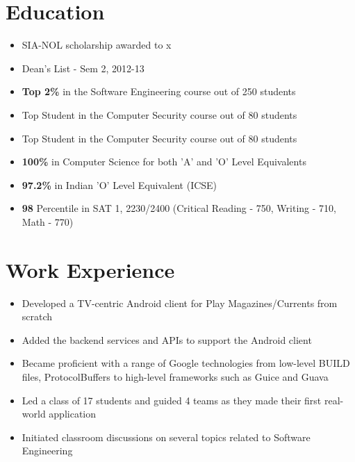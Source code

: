 \documentclass[11pt,a4paper]{moderncv}
\begin{document}
\makecvtitle

\section{Education}
{\begin{itemize}
        \item SIA-NOL scholarship awarded to x%
        \item Dean's List - Sem 2, 2012-13
        \item \textbf{Top 2\%} in the Software Engineering course out of 250 students
        \item Top Student in the Computer Security course out of 80 students
        \item Top Student in the Computer Security course out of 80 students
 \end{itemize}}

{\begin{itemize}
        \item \textbf{100\%} in Computer Science for both 'A' and 'O' Level Equivalents
        \item \textbf{97.2\%} in Indian 'O' Level Equivalent (ICSE)
        \item \textbf{98} Percentile in SAT 1, 2230/2400 (Critical Reading - 750, Writing - 710, Math - 770)
 \end{itemize}}

\section{Work Experience}
{\begin{itemize}
        \item Developed a TV-centric Android client for Play Magazines/Currents from scratch
        \item Added the backend services and APIs to support the Android client
        \item Became proficient with a range of Google technologies from low-level BUILD files, ProtocolBuffers to
              high-level frameworks such as Guice and Guava
 \end{itemize}}
{\begin{itemize}
        \item Led a class of 17 students and guided 4 teams as they made their first real-world application
        \item Initiated classroom discussions on several topics related to Software Engineering
 \end{itemize}}
\end{document}
